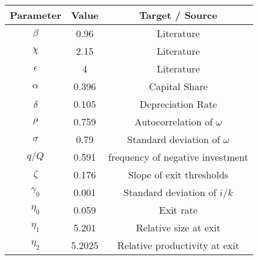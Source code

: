 {\fontshape\scdefault\selectfont 
\begin{tabular}{ccc}  
\hline\hline  
 Parameter & Value & Target / Source  \\  
 			\hline  
$\beta$ &0.96& Literature \\  
$\chi$ &2.15& Literature \\  
$\epsilon$ &4& Literature \\  
 			\hline  
$\alpha$ &0.396& Capital Share \\  
$\delta$ &0.105& Depreciation Rate \\  
 			\hline  
$\rho$ &0.759& Autocorrelation of $\omega$ \\  
 $\sigma$ &0.79& Standard deviation of $\omega$ \\  
 $q/Q$ &0.591& frequency of negative investment \\  
 $\zeta$ &0.176& Slope of exit thresholds \\  
 $\gamma_0$ &0.001& Standard deviation of $i/k$ \\  
 $\eta_0$ &0.059& Exit rate \\  
 $\eta_1$ &5.201& Relative size at exit \\  
 $\eta_2$ &5.2025& Relative productivity at exit \\  
 \hline\hline  
 \end{tabular}  
 }  
